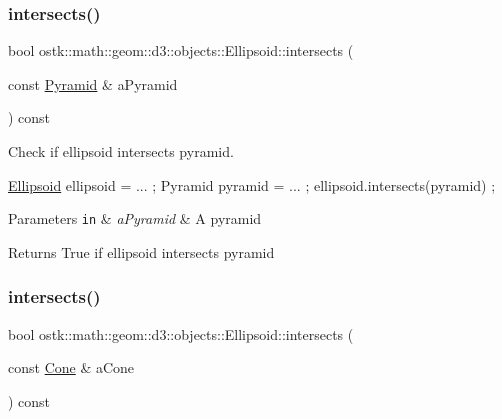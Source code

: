\subsubsection{\texorpdfstring{intersects()}{intersects()}\hspace{0.1cm}{\footnotesize\ttfamily [9/10]}}
{\footnotesize\ttfamily bool ostk\+::math\+::geom\+::d3\+::objects\+::\+Ellipsoid\+::intersects (\begin{DoxyParamCaption}\item[{const \hyperlink{classostk_1_1math_1_1geom_1_1d3_1_1objects_1_1_pyramid}{Pyramid} \&}]{a\+Pyramid }\end{DoxyParamCaption}) const}



Check if ellipsoid intersects pyramid. 


\begin{DoxyCode}
\hyperlink{classostk_1_1math_1_1geom_1_1d3_1_1objects_1_1_ellipsoid_a106c71abf9503f3d06b2613c1c7e9d65}{Ellipsoid} ellipsoid = ... ;
Pyramid pyramid = ... ;
ellipsoid.intersects(pyramid) ;
\end{DoxyCode}



\begin{DoxyParams}[1]{Parameters}
\mbox{\tt in}  & {\em a\+Pyramid} & A pyramid \\
\hline
\end{DoxyParams}
\begin{DoxyReturn}{Returns}
True if ellipsoid intersects pyramid 
\end{DoxyReturn}
\mbox{\label{classostk_1_1math_1_1geom_1_1d3_1_1objects_1_1_ellipsoid_a74c6079e4c8d798892438f9560532f86}} 
\subsubsection{\texorpdfstring{intersects()}{intersects()}\hspace{0.1cm}{\footnotesize\ttfamily [10/10]}}
{\footnotesize\ttfamily bool ostk\+::math\+::geom\+::d3\+::objects\+::\+Ellipsoid\+::intersects (\begin{DoxyParamCaption}\item[{const \hyperlink{classostk_1_1math_1_1geom_1_1d3_1_1objects_1_1_cone}{Cone} \&}]{a\+Cone }\end{DoxyParamCaption}) const}



